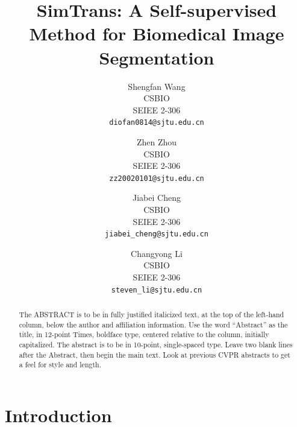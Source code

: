 \documentclass[10pt,twocolumn,letterpaper]{article}
\def\confName{CVPR}
\begin{document}
\title{SimTrans: A Self-supervised Method for Biomedical Image Segmentation}

\author{Shengfan Wang\\
CSBIO\\
SEIEE 2-306\\
{\tt\small diofan0814@sjtu.edu.cn}
\and
Zhen Zhou\\
CSBIO\\
SEIEE 2-306\\
{\tt\small zz20020101@sjtu.edu.cn}
\and
Jiabei Cheng\\
CSBIO\\
SEIEE 2-306\\
{\tt\small jiabei\_cheng@sjtu.edu.cn}
\and
Changyong Li\\
CSBIO\\
SEIEE 2-306\\
{\tt\small steven\_li@sjtu.edu.cn}
}
\maketitle

\begin{abstract}
   The ABSTRACT is to be in fully justified italicized text, at the top of the left-hand column, below the author and affiliation information.
   Use the word ``Abstract'' as the title, in 12-point Times, boldface type, centered relative to the column, initially capitalized.
   The abstract is to be in 10-point, single-spaced type.
   Leave two blank lines after the Abstract, then begin the main text.
   Look at previous CVPR abstracts to get a feel for style and length.
\end{abstract}

\section{Introduction}
\label{sec:intro}
\end{document}
